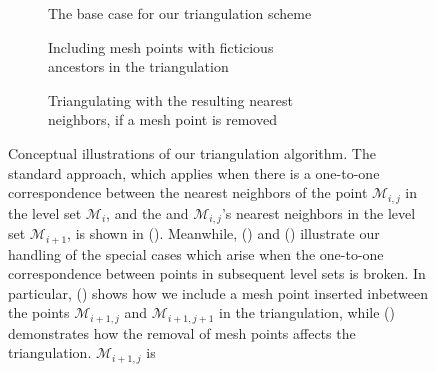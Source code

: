 \begin{figure}[htpb]
    \centering
    \begin{subfigure}[b]{0.55\textwidth}
        \centering
        \resizebox{0.9\linewidth}{!}%
        {}
        \caption[]{{\small The base case for our triangulation scheme}}
        \label{fig:triangulation_basecase}
    \end{subfigure}

    \begin{subfigure}[b]{0.475\textwidth}
        \centering
        \resizebox{0.9\linewidth}{!}%
        {}
        \caption[]{{\small Including mesh points with ficticious
        \\\phantom{(b)} ancestors in the triangulation}}
        \label{fig:triangulation_pointinserted}
    \end{subfigure}
    \begin{subfigure}[b]{0.475\textwidth}
        \centering
        \resizebox{0.9\linewidth}{!}%
        {}
        \caption[]{{\small Triangulating with the resulting nearest
        \\\phantom{(c)} neighbors, if a mesh point is removed}}
        \label{fig:triangulation_pointremoved}
    \end{subfigure}
    \caption[Conceptual illustrations of our triangulation algorithm]
    {Conceptual illustrations of our triangulation algorithm. The standard
        approach, which applies when there is a one-to-one correspondence
        between the nearest neighbors of the point $\mathcal{M}_{i,j}$ in the
        level set $\mathcal{M}_{i}$, and the and $\mathcal{M}_{i,j}$'s nearest
        neighbors in the level set $\mathcal{M}_{i+1}$, is shown in
        (). Meanwhile,
        () and
        () illustrate our handling of
        the special cases which arise when the one-to-one correspondence
        between points in subsequent level sets is broken. In particular,
        () shows how we include
        a mesh point inserted inbetween the points $\mathcal{M}_{i+1,j}$
        and $\mathcal{M}_{i+1,j+1}$ in the triangulation, while
        () demonstrates how the removal
        of mesh points affects the triangulation. $\mathcal{M}_{i+1,j}$ is
}
\end{figure}
